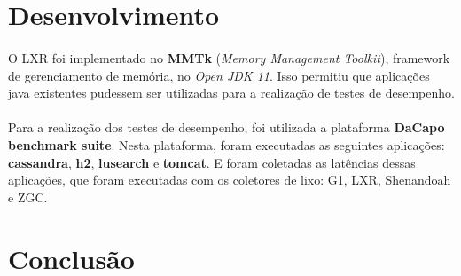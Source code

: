 \documentclass[12pt]{article}
\begin{document}
\section{Desenvolvimento}

\paragraph{}O LXR foi implementado no \textbf{MMTk} (\textit{Memory Management Toolkit}), framework de gerenciamento de memória, no \textit{Open JDK 11}. Isso permitiu que aplicações java existentes pudessem ser utilizadas para a realização de testes de desempenho.

\paragraph{}Para a realização dos testes de desempenho, foi utilizada a plataforma \textbf{DaCapo benchmark suite}. Nesta plataforma, foram executadas as seguintes aplicações: \textbf{cassandra}, \textbf{h2}, \textbf{lusearch} e \textbf{tomcat}. E foram coletadas as latências dessas aplicações, que foram executadas com os coletores de lixo: G1, LXR, Shenandoah e ZGC.

\section{Conclusão}




\nocite{10.1145/3519939.3523440}
\end{document}
